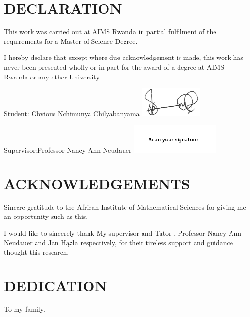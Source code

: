 \chapter*{DECLARATION}
This work was carried out at AIMS Rwanda in partial fulfilment of the requirements for a Master of Science Degree.

I hereby declare that except where due acknowledgement is made, this work has never been presented wholly or in part for the award of a degree at AIMS Rwanda or any other University.

\vspace{1.5cm}
Student: Obvious Nchimunya Chilyabanyama \includegraphics[height=1.5cm]{images/signature.png}

\vspace{1.5cm}

Supervisor:Professor Nancy Ann Neudauer  \includegraphics[height=1.5cm]{images/signature1.png}


\newpage

\chapter*{ACKNOWLEDGEMENTS}
Sincere gratitude to the African Institute of Mathematical Sciences for giving me an opportunity such as this.

I would like to sincerely thank My supervisor and Tutor , Professor Nancy Ann Neudauer and Jan H{\k{a}}z{\l}a respectively, for their tireless support and guidance thought this research.
 
\newpage
\chapter*{DEDICATION} 

To my family.